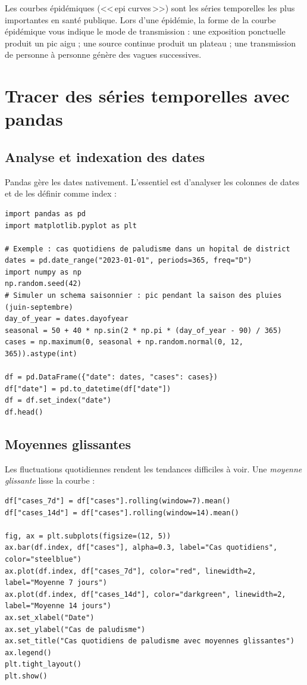 \begin{clinicalnote}
Les courbes \'epid\'emiques (<<\,epi curves\,>>) sont les s\'eries temporelles les plus importantes en sant\'e publique. Lors d'une \'epid\'emie, la forme de la courbe \'epid\'emique vous indique le mode de transmission : une exposition ponctuelle produit un pic aigu ; une source continue produit un plateau ; une transmission de personne \`a personne g\'en\`ere des vagues successives.
\end{clinicalnote}

\section{Tracer des s\'eries temporelles avec pandas}

\subsection{Analyse et indexation des dates}

Pandas g\`ere les dates nativement. L'essentiel est d'analyser les colonnes de dates et de les d\'efinir comme index :

\begin{verbatim}
import pandas as pd
import matplotlib.pyplot as plt

# Exemple : cas quotidiens de paludisme dans un hopital de district
dates = pd.date_range("2023-01-01", periods=365, freq="D")
import numpy as np
np.random.seed(42)
# Simuler un schema saisonnier : pic pendant la saison des pluies (juin-septembre)
day_of_year = dates.dayofyear
seasonal = 50 + 40 * np.sin(2 * np.pi * (day_of_year - 90) / 365)
cases = np.maximum(0, seasonal + np.random.normal(0, 12, 365)).astype(int)

df = pd.DataFrame({"date": dates, "cases": cases})
df["date"] = pd.to_datetime(df["date"])
df = df.set_index("date")
df.head()
\end{verbatim}

\subsection{Moyennes glissantes}

Les fluctuations quotidiennes rendent les tendances difficiles \`a voir. Une \emph{moyenne glissante} lisse la courbe :

\begin{verbatim}
df["cases_7d"] = df["cases"].rolling(window=7).mean()
df["cases_14d"] = df["cases"].rolling(window=14).mean()

fig, ax = plt.subplots(figsize=(12, 5))
ax.bar(df.index, df["cases"], alpha=0.3, label="Cas quotidiens", color="steelblue")
ax.plot(df.index, df["cases_7d"], color="red", linewidth=2, label="Moyenne 7 jours")
ax.plot(df.index, df["cases_14d"], color="darkgreen", linewidth=2, label="Moyenne 14 jours")
ax.set_xlabel("Date")
ax.set_ylabel("Cas de paludisme")
ax.set_title("Cas quotidiens de paludisme avec moyennes glissantes")
ax.legend()
plt.tight_layout()
plt.show()
\end{verbatim}

